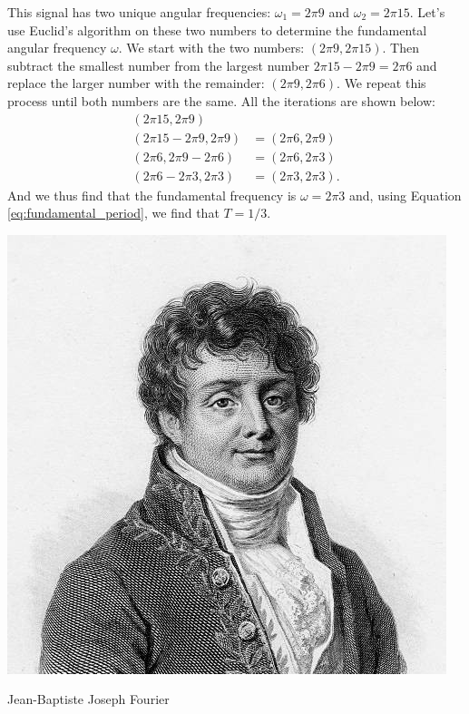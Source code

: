 This signal has two unique angular frequencies: $\omega_1 = 2\pi 9$ and $\omega_2 = 2\pi 15$.
Let's use Euclid's algorithm on these two numbers to determine the fundamental angular frequency $\omega$.
We start with the two numbers: $(2\pi 9, 2\pi15)$. Then subtract the smallest number from the
largest number $2\pi 15 - 2\pi 9 = 2\pi 6$ and replace the larger number with the remainder: $(2\pi 9, 2\pi 6)$.
We repeat this process until both numbers are the same.
All the iterations are shown below:
\begin{align*}
  (2\pi 15, 2\pi 9)        &                     \\
  (2\pi 15-2\pi 9, 2\pi 9) & = (2\pi 6, 2\pi 9)  \\
  (2\pi 6, 2\pi 9-2\pi 6)  & = (2\pi 6, 2\pi 3)  \\
  (2\pi 6-2\pi 3, 2\pi 3)  & = (2\pi 3, 2\pi 3).
\end{align*}
And we thus find that the fundamental frequency is $\omega=2\pi 3$ and, using
Equation \ref{eq:fundamental_period}, we find that $T = 1/3$.

\begin{marginfigure}[1cm]
  \begin{center}
    \includegraphics[width=\textwidth]{ch01/figures/fourier_head.jpg}
  \end{center}
  \caption{Jean-Baptiste Joseph Fourier}
  \label{fig:joe_fourier2}
\end{marginfigure}

